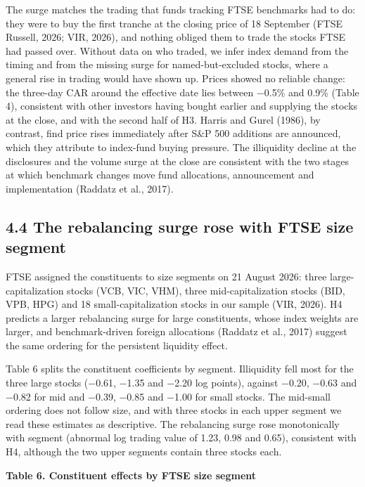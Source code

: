 The surge matches the trading that funds tracking FTSE benchmarks had to
do: they were to buy the first tranche at the closing price of 18
September (FTSE Russell, 2026; VIR, 2026), and nothing obliged them to
trade the stocks FTSE had passed over. Without data on who traded, we
infer index demand from the timing and from the missing surge for
named-but-excluded stocks, where a general rise in trading would have
shown up. Prices showed no reliable change: the three-day CAR around the
effective date lies between −0.5\% and 0.9\% (Table 4), consistent with
other investors having bought earlier and supplying the stocks at the
close, and with the second half of H3. Harris and Gurel (1986), by
contrast, find price rises immediately after S\&P 500 additions are
announced, which they attribute to index-fund buying pressure. The
illiquidity decline at the disclosures and the volume surge at the close
are consistent with the two stages at which benchmark changes move fund
allocations, announcement and implementation (Raddatz et al., 2017).

\hypertarget{the-rebalancing-surge-rose-with-ftse-size-segment}{%
\subsection{4.4 The rebalancing surge rose with FTSE size
segment}\label{the-rebalancing-surge-rose-with-ftse-size-segment}}

FTSE assigned the constituents to size segments on 21 August 2026: three
large-capitalization stocks (VCB, VIC, VHM), three mid-capitalization
stocks (BID, VPB, HPG) and 18 small-capitalization stocks in our sample
(VIR, 2026). H4 predicts a larger rebalancing surge for large
constituents, whose index weights are larger, and benchmark-driven
foreign allocations (Raddatz et al., 2017) suggest the same ordering for
the persistent liquidity effect.

Table 6 splits the constituent coefficients by segment. Illiquidity fell
most for the three large stocks (−0.61, −1.35 and −2.20 log points),
against −0.20, −0.63 and −0.82 for mid and −0.39, −0.85 and −1.00 for
small stocks. The mid-small ordering does not follow size, and with
three stocks in each upper segment we read these estimates as
descriptive. The rebalancing surge rose monotonically with segment
(abnormal log trading value of 1.23, 0.98 and 0.65), consistent with H4,
although the two upper segments contain three stocks each.

\textbf{Table 6. Constituent effects by FTSE size segment}

